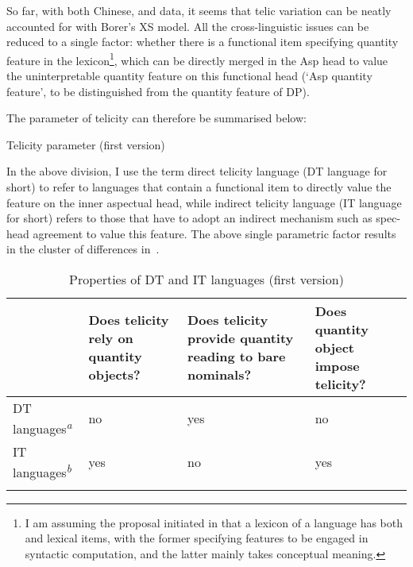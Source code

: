 \documentclass[output=paper]{langsci/langscibook}
\begin{document}
So far, with both Chinese,  and  data, it seems that
telic variation can be neatly accounted for with Borer's XS model. All the
cross-linguistic issues can be reduced to a single factor: whether there is a
functional item specifying quantity feature in the lexicon\footnote{I am
    assuming the proposal initiated in 
    \citep[cf.][]{HalleMarantz1993,marantz2007phases} that a lexicon of a
    language has both  and lexical items, with the former
    specifying features to be engaged in syntactic computation, and the latter
mainly takes conceptual meaning.}, which can be directly merged in the
Asp head to value the uninterpretable quantity feature on this
functional head (`Asp quantity feature', to be
distinguished from the quantity feature of DP).

The parameter of telicity can therefore be summarised below:

\begin{exe}\ex Telicity parameter (first version)\smallskip\\
\end{exe}

In the above division, I use the term direct telicity language
(\gls{DT} language for short) to refer to languages that contain a
functional item to directly value the feature on the inner aspectual head,
while indirect telicity language (\gls{IT} language for short)
refers to those that have to adopt an indirect mechanism such as spec-head
agreement to value this feature. The above single parametric factor results in
the cluster of differences in~.

\begin{table}
\caption{Properties of DT and IT languages (first version)}\label{table:1}
\begin{tabularx}{1\textwidth}{lQQQ}
\lsptoprule
{} & Does telicity rely on quantity objects? & Does telicity provide quantity reading to bare nominals? & Does quantity object impose telicity? \\
\midrule
DT languages\textsuperscript{\itshape a} & no  & yes & no\\
IT languages\textsuperscript{\itshape b} & yes & no & yes\\
\lspbottomrule
\end{tabularx}
\end{table}
\end{document}
